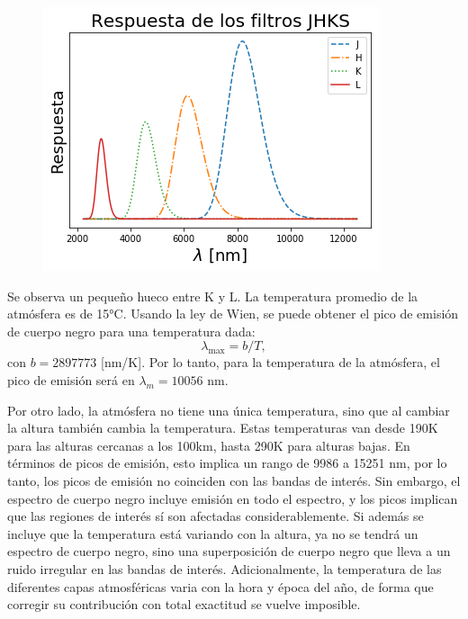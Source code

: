 \documentclass[notitlepage,letterpaper,12pt]{article} %
\begin{document}
\begin{figure}[h]
  \centering
   \includegraphics[scale= 0.8]{respuestaJHKS.png}
\end{figure}


Se observa un pequeño hueco entre K y L.
La temperatura promedio de la atmósfera es de 15°C.
Usando la ley de Wien, se puede obtener el pico de emisión de cuerpo negro para una temperatura dada:
\begin{equation}
\lambda_{\text{max}} = b/T,
\end{equation}
con $b = 2897773$ [nm/K]. Por lo tanto, para la temperatura de la atmósfera, el pico de emisión será en $\lambda_m = 10056$ nm.

Por otro lado, la atmósfera no tiene una única temperatura, sino que al cambiar la altura también cambia la temperatura.
Estas temperaturas van desde 190K para las alturas cercanas a los 100km, hasta 290K para alturas bajas.
En términos de picos de emisión, esto implica un rango de 9986 a 15251 nm, por lo tanto, los picos de emisión no coinciden con las bandas de interés.
Sin embargo, el espectro de cuerpo negro incluye emisión en todo el espectro, y los picos implican que las regiones de interés sí son afectadas considerablemente.
Si además se incluye que la temperatura está variando con la altura, ya no se tendrá un espectro de cuerpo negro, sino una superposición de cuerpo negro que lleva a un ruido irregular en las bandas de interés.
Adicionalmente, la temperatura de las diferentes capas atmosféricas varia con la hora y época del año, de forma que corregir su contribución con total exactitud se vuelve imposible.
\end{document}
